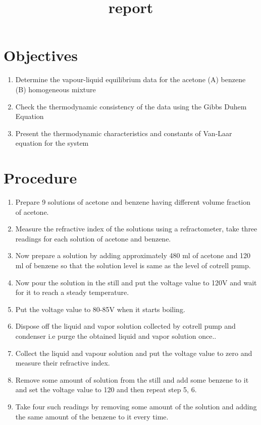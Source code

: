 \documentclass[11pt]{article}
\title{report}
\date{}
\providecommand{\tightlist}{%
      \setlength{\itemsep}{0pt}\setlength{\parskip}{0pt}}
\begin{document}
\hypertarget{objectives}{%
  \section{Objectives}\label{objectives}}

\begin{enumerate}
  \def\labelenumi{\arabic{enumi}.}
  \tightlist
  \item
        Determine the vapour-liquid equilibrium data for the acetone (A)
        benzene (B) homogeneous mixture
  \item
        Check the thermodynamic consistency of the data using the Gibbs Duhem
        Equation
  \item
        Present the thermodynamic characteristics and constants of Van-Laar
        equation for the system
\end{enumerate}

\hypertarget{procedure}{%
  \section{Procedure}\label{procedure}}

\begin{enumerate}
  \def\labelenumi{\arabic{enumi}.}
  \tightlist
  \item
        Prepare 9 solutions of acetone and benzene having different volume
        fraction of acetone.
  \item
        Measure the refractive index of the solutions using a refractometer,
        take three readings for each solution of acetone and benzene.
  \item
        Now prepare a solution by adding approximately 480 ml of acetone and
        120 ml of benzene so that the solution level is same as the level of
        cotrell pump.
  \item
        Now pour the solution in the still and put the voltage value to 120V
        and wait for it to reach a steady temperature.
  \item
        Put the voltage value to 80-85V when it starts boiling.
  \item
        Dispose off the liquid and vapor solution collected by cotrell pump
        and condenser i.e purge the obtained liquid and vapor solution once..
  \item
        Collect the liquid and vapour solution and put the voltage value to
        zero and measure their refractive index.
  \item
        Remove some amount of solution from the still and add some benzene to
        it and set the voltage value to 120 and then repeat step 5, 6.
  \item
        Take four such readings by removing some amount of the solution and
        adding the same amount of the benzene to it every time.
\end{enumerate}
\end{document}
